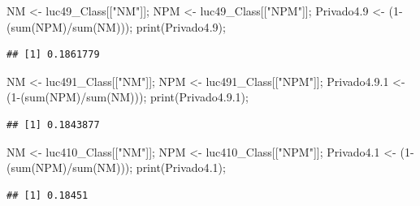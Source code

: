 \documentclass[
]{article}
\newenvironment{Shaded}{\begin{snugshade}}{\end{snugshade}}
\newcommand{\DecValTok}[1]{\textcolor[rgb]{0.00,0.00,0.81}{#1}}
\newcommand{\FloatTok}[1]{\textcolor[rgb]{0.00,0.00,0.81}{#1}}
\newcommand{\FunctionTok}[1]{\textcolor[rgb]{0.00,0.00,0.00}{#1}}
\newcommand{\NormalTok}[1]{#1}
\newcommand{\OtherTok}[1]{\textcolor[rgb]{0.56,0.35,0.01}{#1}}
\newcommand{\SpecialCharTok}[1]{\textcolor[rgb]{0.00,0.00,0.00}{#1}}
\newcommand{\StringTok}[1]{\textcolor[rgb]{0.31,0.60,0.02}{#1}}
\begin{document}
\begin{Shaded}
\begin{Highlighting}[]
\NormalTok{NM }\OtherTok{\textless{}{-}}\NormalTok{ luc49\_Class[[}\StringTok{"NM"}\NormalTok{]];}
\NormalTok{NPM }\OtherTok{\textless{}{-}}\NormalTok{ luc49\_Class[[}\StringTok{"NPM"}\NormalTok{]];}
\NormalTok{Privado4}\FloatTok{.9} \OtherTok{\textless{}{-}}\NormalTok{ (}\DecValTok{1}\SpecialCharTok{{-}}\NormalTok{(}\FunctionTok{sum}\NormalTok{(NPM)}\SpecialCharTok{/}\FunctionTok{sum}\NormalTok{(NM)));}
\FunctionTok{print}\NormalTok{(Privado4}\FloatTok{.9}\NormalTok{);}
\end{Highlighting}
\end{Shaded}

\begin{verbatim}
## [1] 0.1861779
\end{verbatim}

\begin{Shaded}
\begin{Highlighting}[]
\NormalTok{NM }\OtherTok{\textless{}{-}}\NormalTok{ luc491\_Class[[}\StringTok{"NM"}\NormalTok{]];}
\NormalTok{NPM }\OtherTok{\textless{}{-}}\NormalTok{ luc491\_Class[[}\StringTok{"NPM"}\NormalTok{]];}
\NormalTok{Privado4.}\FloatTok{9.1} \OtherTok{\textless{}{-}}\NormalTok{ (}\DecValTok{1}\SpecialCharTok{{-}}\NormalTok{(}\FunctionTok{sum}\NormalTok{(NPM)}\SpecialCharTok{/}\FunctionTok{sum}\NormalTok{(NM)));}
\FunctionTok{print}\NormalTok{(Privado4.}\FloatTok{9.1}\NormalTok{);}
\end{Highlighting}
\end{Shaded}

\begin{verbatim}
## [1] 0.1843877
\end{verbatim}

\begin{Shaded}
\begin{Highlighting}[]
\NormalTok{NM }\OtherTok{\textless{}{-}}\NormalTok{ luc410\_Class[[}\StringTok{"NM"}\NormalTok{]];}
\NormalTok{NPM }\OtherTok{\textless{}{-}}\NormalTok{ luc410\_Class[[}\StringTok{"NPM"}\NormalTok{]];}
\NormalTok{Privado4}\FloatTok{.1} \OtherTok{\textless{}{-}}\NormalTok{ (}\DecValTok{1}\SpecialCharTok{{-}}\NormalTok{(}\FunctionTok{sum}\NormalTok{(NPM)}\SpecialCharTok{/}\FunctionTok{sum}\NormalTok{(NM)));}
\FunctionTok{print}\NormalTok{(Privado4}\FloatTok{.1}\NormalTok{);}
\end{Highlighting}
\end{Shaded}

\begin{verbatim}
## [1] 0.18451
\end{verbatim}
\end{document}
